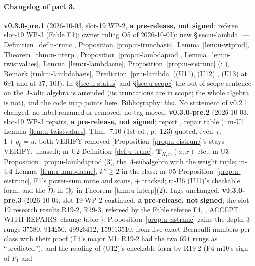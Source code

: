 \documentclass[11pt]{article}
\newcommand{\VERIFYloc}{\textsf{VERIFY}}          %
\newcommand{\Iw}{\Lambda}                         %
\newcommand{\Tu}{\mathbf{T}}                      %
\begin{document}
\paragraph{Changelog of part 3.} \textbf{v0.3.0-pre.1} (2026-10-03, slot-19 WP-2, \textbf{a pre-release, not signed}; referee slot-19 WP-3 (Fable F1); owner ruling O5
of 2026-10-03): new \S\ref{sec:u-lambda} --- Definition~\ref{def:u-trunc}, Proposition~\ref{prop:u-truncbasic}, Lemma~\ref{lem:u-wtprod}, Theorem~\ref{thm:u-interp},
Proposition~\ref{prop:u-lambdaprod}, Lemma~\ref{lem:u-twistvalues}, Lemma~\ref{lem:u-lambdaone}, Proposition~\ref{prop:u-eistrunc} (\COMP: ),
Remark~\ref{rmk:u-lambdabasis}, Prediction~\ref{pr:u-lambda} ((U11), (U12) \PROVED, (U13) \PROVED{} at $691$ and \CONJ{} at $37$, $103$). In \S\ref{sec:u-status} and
\S\ref{sec:u-scope} the out-of-scope sentence on the $\Iw$-adic algebra is amended (its truncations are in scope; the whole algebra is not), and the code map
points here. Bibliography: \texttt{hho}. No statement of v0.2.1 changed, no label renamed or removed, no tag moved.
\textbf{v0.3.0-pre.2} (2026-10-03, slot-19 WP-3 repairs, \textbf{a pre-release, not signed}; report ,
repair table ): m-U1 Lemma~\ref{lem:u-twistvalues}, Thm.~7.10 (1st ed., p.~123) quoted, even $\chi$, $1+q_0=u$, both
\VERIFYloc{} removed (Proposition~\ref{prop:u-eistrunc}'s \cite{hho} stays \VERIFYloc, unused); m-U2 Definition~\ref{def:u-trunc}, $\Tu_{K,m}(a;x)$ etc.; m-U3
Proposition~\ref{prop:u-lambdaprod}(3), the $\Iw$-subalgebra with the weight tuple; m-U4 Lemma~\ref{lem:u-lambdaone}, $k''\ge2$ in the class; m-U5
Proposition~\ref{prop:u-eistrunc}, F1's power-sum route and scans,  +  tracked; m-U6 (U11)'s checkable
form, and the $\tilde D_i$ in $\mathbb{Q}_\ell$ in Theorem~\ref{thm:u-interp}(2). Tags unchanged.
\textbf{v0.3.0-pre.3} (2026-10-04, slot-19 WP-2 continued, \textbf{a pre-release, not signed}; the slot-19 research results R19-2, R19-3, refereed by the Fable
referee F4, , ACCEPT WITH REPAIRS; change table ):
Proposition~\ref{prop:u-eistrunc} gains the depth-$3$ rungs $37580$, $914250$, $49928412$, $159113510$, \PROVED{} from five exact Bernoulli numbers per class with
their proof (F4's major M1: R19-2 had the two $691$ rungs as ``predicted''), and the \COMP{} reading of (U12)'s checkable form by R19-2 (F4 m10's sign of $F_1$ and
\end{document}
